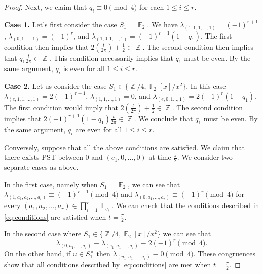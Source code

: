 \documentclass[10pt,a4paper]{amsart}
\DeclareMathOperator{\F}{\mathbb{F}}
\DeclareMathOperator{\Z}{\mathbb{Z}}
\begin{document}
\begin{proof}
Next, we claim that $q_i \equiv 0 \pmod{4}$ for each $1 \leq i \leq r.$

\textbf{Case 1.} Let's first consider the case $S_1=\F_2.$ We have $\lambda_{(1, 1, 1,\ldots, 1)}=(-1)^{r+1}$,  $\lambda_{(0,1,\ldots, 1)} =(-1)^r$, and $\lambda_{(1, 0, 1, \ldots, 1)}=(-1)^{r+1}(1-q_1).$ The first condition then implies that $2(\frac{t}{2 \pi})+\frac{1}{2} \in \Z.$ The second condition then implies that $q_1 \frac{t}{2 \pi} \in \Z.$ This condition necessarily implies that $q_1$ must be even. By the same argument, $q_i$ is even for all $1 \leq i \leq r.$

\textbf{Case 2.} Let us consider the case $S_1 \in \{\Z/4, \F_2[x]/x^2 \}.$ In this case $\lambda_{(e, 1, 1,\ldots, 1)}=2(-1)^{r+1}$, $\lambda_{(1,1,\ldots, 1)}=0$,  and $\lambda_{(e,0,1\ldots,1)}= 2(-1)^r (1-q_1).$ The first condition would imply that $2(\frac{t}{2 \pi})+\frac{1}{2} \in \Z.$ The second condition implies that $2(-1)^{r+1}(1-q_1) \frac{t}{2 \pi} \in \Z. $ We conclude that $q_1$ must be even. By the same argument, $q_i$ are even for all $1 \leq i \leq r.$



Conversely, suppose that all the above conditions are satisfied. We claim that there exists PST between $0$ and $(e_1, 0, \ldots, 0)$ at time $\frac{\pi}{2}.$ We consider two separate cases as above. 

In the first case, namely when $S_1 = \F_2$, we can see that $\lambda_{(1,a_1, a_2, \ldots, a_r)} \equiv (-1)^{r+1} \pmod{4}$ and $\lambda_{(0, a_1, \ldots, a_r)} \equiv (-1)^r \pmod{4}$ for every $(a_1, a_2, \ldots, a_r) \in \prod_{i=1}^r \F_{q_i}.$ We can check that the conditions described in \cref{eq:conditions} are satisfied when $t = \frac{\pi}{2}.$


In the second case where $S_1 \in \{\Z/4, \F_2[x]/x^2\}$ we can see that 
\[ \lambda_{(0,a_1, \ldots, a_r)} \equiv \lambda_{(e_1, a_1, \ldots, a_r)} \equiv 2(-1)^r \pmod{4} .\] 
On the other hand, if $u \in S_1^{\times}$ then $\lambda_{(u_1, a_1, \ldots, a_r)} \equiv 0 \pmod{4}$. These congruences show that all conditions described by \cref{eq:conditions} are met when $t = \frac{\pi}{2}.$
\end{proof}
\end{document}
